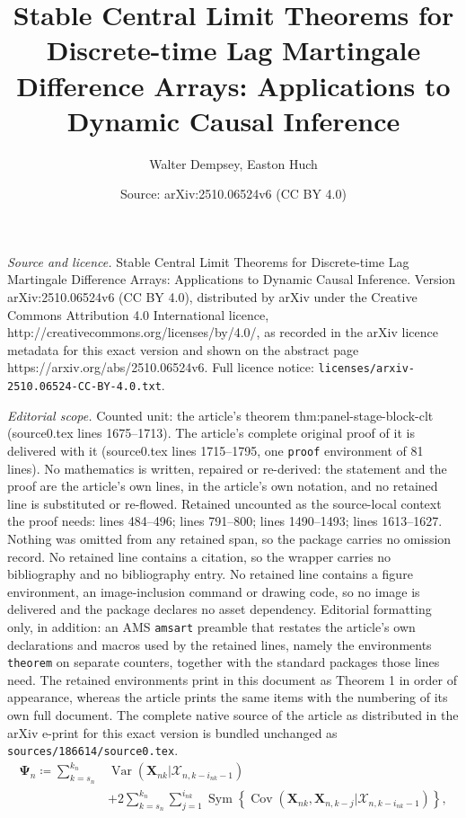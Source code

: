 \documentclass[10pt,a4paper]{amsart}
\title{Stable Central Limit Theorems for Discrete-time Lag Martingale Difference Arrays: Applications to Dynamic Causal Inference}
\author{Walter Dempsey, Easton Huch}
\date{Source: arXiv:2510.06524v6 (CC BY 4.0)}
\DeclareMathOperator{\Cov}{Cov}
\DeclareMathOperator{\Sym}{Sym}
\DeclareMathOperator{\Var}{Var}
\newcommand{\X}{\mathcal{X}}
\newcommand\mat[1]{\mathbf{#1}}
\renewcommand\vec[1]{\boldsymbol{#1}}
\begin{document}
\maketitle

\noindent\emph{Source and licence.} Stable Central Limit Theorems for Discrete-time Lag Martingale Difference Arrays: Applications to Dynamic Causal Inference. Version arXiv:2510.06524v6 (CC BY 4.0), distributed by arXiv under the Creative Commons Attribution 4.0 International licence, http://creativecommons.org/licenses/by/4.0/, as recorded in the arXiv licence metadata for this exact version and shown on the abstract page https://arxiv.org/abs/2510.06524v6. Full licence notice: \texttt{licenses/arxiv-2510.06524-CC-BY-4.0.txt}.\par\smallskip

\noindent\textit{Editorial scope.} Counted unit: the article's theorem thm:panel-stage-block-clt (source0.tex lines 1675--1713). The article's complete original proof of it is delivered with it (source0.tex lines 1715--1795, one \texttt{proof} environment of 81 lines). No mathematics is written, repaired or re-derived: the statement and the proof are the article's own lines, in the article's own notation, and no retained line is substituted or re-flowed.  Retained uncounted as the source-local context the proof needs: lines 484--496; lines 791--800; lines 1490--1493; lines 1613--1627.  Nothing was omitted from any retained span, so the package carries no omission record.  No retained line contains a citation, so the wrapper carries no bibliography and no bibliography entry.  No retained line contains a figure environment, an image-inclusion command or drawing code, so no image is delivered and the package declares no asset dependency.  Editorial formatting only, in addition: an AMS \texttt{amsart} preamble that restates the article's own declarations and macros used by the retained lines, namely the environments \texttt{theorem} on separate counters, together with the standard packages those lines need.  The retained environments print in this document as Theorem 1 in order of appearance, whereas the article prints the same items with the numbering of its own full document.  The complete native source of the article as distributed in the arXiv e-print for this exact version is bundled unchanged as \texttt{sources/186614/source0.tex}.
\begin{equation}\label{eq:psi-n}
\begin{aligned}
\mat{\Psi}_n \coloneqq
\sum_{k=s_n}^{k_n}
&\Var(\vec{X}_{nk} | \X_{n,k-i_{nk}-1})\\
&+
2 \sum_{k=s_n}^{k_n}
\sum_{j=1}^{i_{nk}}
\Sym\left\{
\Cov(\vec{X}_{nk}, \vec{X}_{n,k-j} | \X_{n,k-i_{nk}-1})
\right\},
\end{aligned}
\end{equation}
\end{document}
